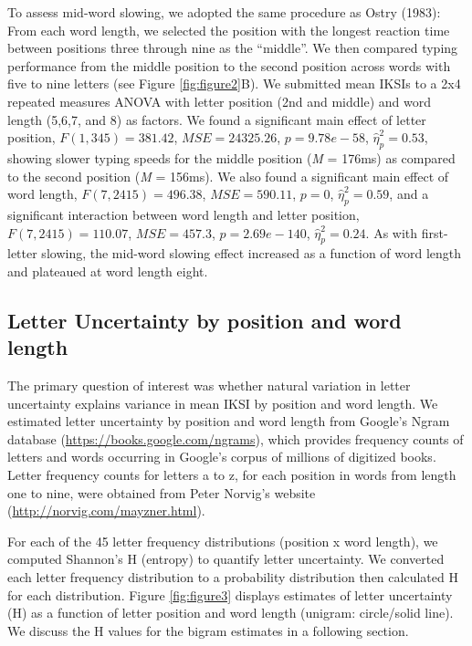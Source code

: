 \documentclass[,man,floatsintext]{apa6}
\begin{document}
To assess mid-word slowing, we adopted the same procedure as Ostry (1983): From each word length, we selected the position with the longest reaction time between positions three through nine as the \enquote{middle}. We then compared typing performance from the middle position to the second position across words with five to nine letters (see Figure \ref{fig:figure2}B). We submitted mean IKSIs to a 2x4 repeated measures ANOVA with letter position (2nd and middle) and word length (5,6,7, and 8) as factors. We found a significant main effect of letter position, \(F(1, 345) = 381.42\), \(\mathit{MSE} = 24325.26\), \(p = 9.78e-58\), \(\hat{\eta}^2_\textit{p} = 0.53\), showing slower typing speeds for the middle position (\textit{M} = 176ms) as compared to the second position (\textit{M} = 156ms). We also found a significant main effect of word length, \(F(7, 2415) = 496.38\), \(\mathit{MSE} = 590.11\), \(p = 0\), \(\hat{\eta}^2_\textit{p} = 0.59\), and a significant interaction between word length and letter position, \(F(7, 2415) = 110.07\), \(\mathit{MSE} = 457.3\), \(p = 2.69e-140\), \(\hat{\eta}^2_\textit{p} = 0.24\). As with first-letter slowing, the mid-word slowing effect increased as a function of word length and plateaued at word length eight.

\hypertarget{letter-uncertainty-by-position-and-word-length}{%
\subsection{Letter Uncertainty by position and word length}\label{letter-uncertainty-by-position-and-word-length}}

The primary question of interest was whether natural variation in letter uncertainty explains variance in mean IKSI by position and word length. We estimated letter uncertainty by position and word length from Google's Ngram database (\url{https://books.google.com/ngrams}), which provides frequency counts of letters and words occurring in Google's corpus of millions of digitized books. Letter frequency counts for letters a to z, for each position in words from length one to nine, were obtained from Peter Norvig's website (\url{http://norvig.com/mayzner.html}).

For each of the 45 letter frequency distributions (position x word length), we computed Shannon's H (entropy) to quantify letter uncertainty. We converted each letter frequency distribution to a probability distribution then calculated H for each distribution. Figure \ref{fig:figure3} displays estimates of letter uncertainty (H) as a function of letter position and word length (unigram: circle/solid line). We discuss the H values for the bigram estimates in a following section.
\end{document}

